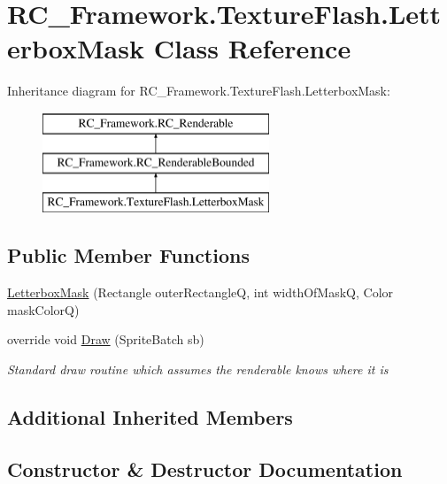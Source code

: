 \hypertarget{class_r_c___framework_1_1_texture_flash_1_1_letterbox_mask}{}\section{R\+C\+\_\+\+Framework.\+Texture\+Flash.\+Letterbox\+Mask Class Reference}
\label{class_r_c___framework_1_1_texture_flash_1_1_letterbox_mask}
Inheritance diagram for R\+C\+\_\+\+Framework.\+Texture\+Flash.\+Letterbox\+Mask\+:\begin{figure}[H]
\begin{center}
\leavevmode
\includegraphics[height=3.000000cm]{class_r_c___framework_1_1_texture_flash_1_1_letterbox_mask}
\end{center}
\end{figure}
\subsection*{Public Member Functions}
\begin{DoxyCompactItemize}
\item 
\mbox{\hyperlink{class_r_c___framework_1_1_texture_flash_1_1_letterbox_mask_a5b9e168c4c83a61ed8a42dbc5ded5425}{Letterbox\+Mask}} (Rectangle outer\+RectangleQ, int width\+Of\+MaskQ, Color mask\+ColorQ)
\item 
override void \mbox{\hyperlink{class_r_c___framework_1_1_texture_flash_1_1_letterbox_mask_aadd01ce0789efac12bc044f336bb5b33}{Draw}} (Sprite\+Batch sb)
\begin{DoxyCompactList}\small\item\em Standard draw routine which assumes the renderable knows where it is \end{DoxyCompactList}\end{DoxyCompactItemize}
\subsection*{Additional Inherited Members}


\subsection{Constructor \& Destructor Documentation}
\mbox{\label{class_r_c___framework_1_1_texture_flash_1_1_letterbox_mask_a5b9e168c4c83a61ed8a42dbc5ded5425}} 
